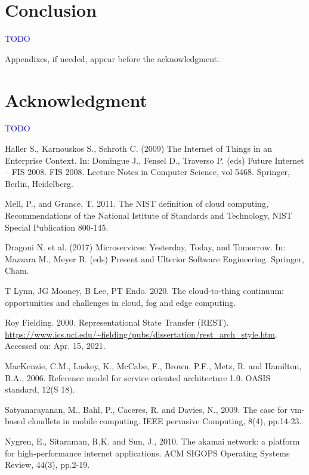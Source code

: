 \documentclass{ieeeaccess}
\begin{document}
\section{Conclusion}
\label{sec:conclusion}

\textcolor{blue}{TODO}

\appendices

Appendixes, if needed, appear before the acknowledgment.

\section*{Acknowledgment}

\textcolor{blue}{TODO}

\begin{thebibliography}{00}

 Haller S., Karnouskos S., Schroth C. (2009) The Internet of Things in an Enterprise Context. In: Domingue J., Fensel D., Traverso P. (eds) Future Internet – FIS 2008. FIS 2008. Lecture Notes in Computer Science, vol 5468. Springer, Berlin, Heidelberg.

 Mell, P., and Grance, T. 2011. The NIST definition of cloud computing, Recommendations of the National Istitute of Standards and Technology, NIST Special Publication 800-145.

 Dragoni N. et al. (2017) Microservices: Yesterday, Today, and Tomorrow. In: Mazzara M., Meyer B. (eds) Present and Ulterior Software Engineering. Springer, Cham.

 T Lynn, JG Mooney, B Lee, PT Endo. 2020. The cloud-to-thing continuum: opportunities and challenges in cloud, fog and edge computing.

 Roy Fielding. 2000. Representational State Transfer (REST). \url{https://www.ics.uci.edu/~fielding/pubs/dissertation/rest\_arch\_style.htm}. Accessed on: Apr. 15, 2021.

 MacKenzie, C.M., Laskey, K., McCabe, F., Brown, P.F., Metz, R. and Hamilton, B.A., 2006. Reference model for service oriented architecture 1.0. OASIS standard, 12(S 18).

 Satyanarayanan, M., Bahl, P., Caceres, R. and Davies, N., 2009. The case for vm-based cloudlets in mobile computing. IEEE pervasive Computing, 8(4), pp.14-23.

 Nygren, E., Sitaraman, R.K. and Sun, J., 2010. The akamai network: a platform for high-performance internet applications. ACM SIGOPS Operating Systems Review, 44(3), pp.2-19.


\end{thebibliography}
\end{document}
